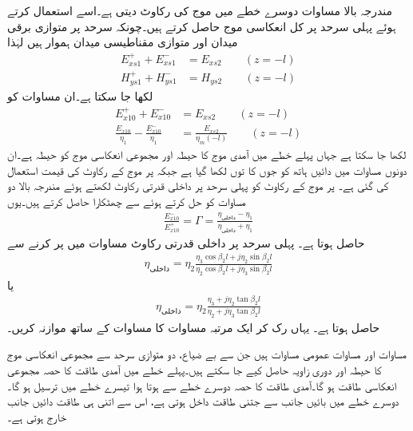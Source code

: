 مندرجہ بالا مساوات دوسرے خطے میں موج کی رکاوٹ دیتی ہے۔اسے استعمال کرتے ہوئے پہلی سرحد پر کل انعکاسی موج حاصل کرتے ہیں۔چونکہ سرحد پر متوازی برقی میدان  اور متوازی مقناطیسی میدان  ہموار ہیں لہٰذا
\begin{align}
E_{xs1}^++E_{xs1}^-&=E_{xs2} \quad \quad (z=-l)\\
H_{ys1}^++H_{ys1}^-&=H_{ys2} \quad \quad (z=-l)
\end{align}
لکھا جا سکتا ہے۔ان مساوات کو
\begin{align}
E_{x10}^+ + E_{x10}^- &=E_{xs2} \quad \quad (z=-l)\\
\frac{E_{x10}}{\eta_1}-\frac{E_{x10}^-}{\eta_1}&=\frac{E_{xs2}}{\eta_m(-l)} \quad \quad (z=-l)
\end{align}
لکھا جا سکتا ہے جہاں پہلے خطے میں آمدی موج کا حیطہ  اور مجموعی انعکاسی موج کو حیطہ  ہے۔ان دونوں مساوات میں دائیں ہاتھ  کو جوں کا توں لکھا گیا ہے جبکہ  پر موج کے رکاوٹ کی قیمت  استعمال کی گئی ہے۔  پر موج کے رکاوٹ کو پہلی سرحد پر داخلی قدرتی رکاوٹ  لکھتے ہوئے مندرجہ بالا دو مساوات کو حل کرتے ہوئے  سے چھٹکارا حاصل کرتے ہیں۔یوں
\begin{align}\label{مساوات_مستوی_شرح_انعکاس_دو_سرحدی}
\frac{E_{x10}^-}{E_{x10}^+}=\Gamma=\frac{\eta_{\text{داخلی}}-\eta_1}{\eta_{\text{داخلی}}+\eta_1}
\end{align}
حاصل ہوتا ہے۔ پہلی سرحد پر داخلی قدرتی رکاوٹ مساوات  میں  پر کرنے سے
\begin{align}\label{مساوات_مستوی_داخلی_رکاوٹ_دو_سرحدی}
\eta_{\text{داخلی}}= \eta_2 \frac{\eta_3 \cos \beta_2 l +j \eta_2 \sin \beta_2 l}{\eta_2 \cos \beta_2 l +j \eta_3\sin \beta_2 l}
\end{align}
یا
\begin{align}\label{مساوات_مستوی_داخلی_رکاوٹ_دو_سرحدی_ب}
\eta_{\text{داخلی}}= \eta_2 \frac{\eta_3  +j \eta_2 \tan \beta_2 l}{\eta_2  +j \eta_3\tan \beta_2 l}
\end{align}
حاصل ہوتا ہے۔  یہاں رک کر ایک مرتبہ مساوات  کا مساوات  کے ساتھ موازنہ کریں۔

مساوات  اور مساوات  عمومی مساوات ہیں جن سے  بے ضیاع، دو متوازی سرحد سے  مجموعی انعکاسی موج کا حیطہ اور دوری زاویہ حاصل کیے جا سکتے ہیں۔پہلے خطے میں آمدی طاقت کا   حصہ مجموعی انعکاسی طاقت ہو گا۔آمدی طاقت کا  حصہ دوسرے خطے سے ہوتا ہوا تیسرے خطے میں ترسیل ہو گا۔دوسرے خطے میں بائیں جانب سے جتنی طاقت داخل ہوتی ہے، اس سے اتنی ہی طاقت دائیں جانب خارج ہوتی ہے۔

